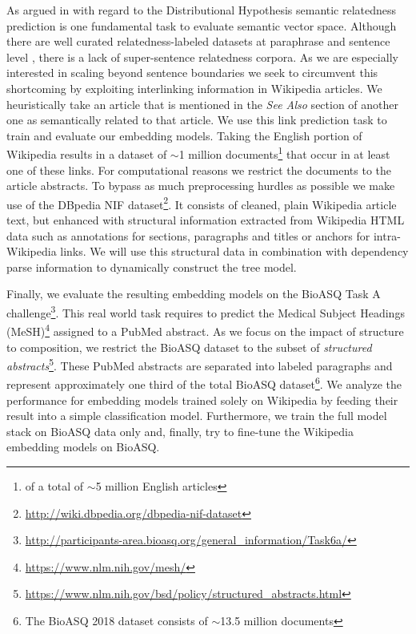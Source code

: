 As argued in \textcite{binder_comparison_2018} with regard to the Distributional Hypothesis \autocite{harris_distributional_1954} semantic relatedness \autocite{resnik_semantic_1999, budanitsky_evaluating_2006} prediction is one fundamental task to evaluate semantic vector space. Although there are well curated relatedness-labeled datasets at paraphrase and sentence level \autocite{pavlick_ppdb_2015, dolan_automatically_2005, marelli_sick_2014,cer_semeval-2017_2017}, there is a lack of super-sentence relatedness corpora. As we are especially interested in scaling beyond sentence boundaries %
we seek to circumvent this shortcoming by exploiting interlinking information in Wikipedia articles. We heuristically take an article that is mentioned in the \textit{See Also} %
section of another one as semantically related to that article. We use this link prediction task to train and evaluate our embedding models. Taking the English portion of Wikipedia results in a dataset of $\sim$1 million documents\footnote{of a total of $\sim$5 million English articles} that occur in at least one of these links. For computational reasons we restrict the documents to the article abstracts. To bypass as much preprocessing hurdles as possible we make use of the DBpedia NIF \autocite{dojchinovski_dbpedia_2018} dataset\footnote{\url{http://wiki.dbpedia.org/dbpedia-nif-dataset}}. It consists of cleaned, plain Wikipedia article text, but enhanced with structural information extracted from Wikipedia HTML data such as annotations for sections, paragraphs and titles or anchors for intra-Wikipedia links. We will use this structural data in combination with dependency parse information to dynamically construct the tree model.

Finally, we evaluate the resulting embedding models on the BioASQ Task A challenge\footnote{\url{http://participants-area.bioasq.org/general_information/Task6a/}}. This real world task requires to predict the Medical Subject Headings (MeSH)\footnote{\url{https://www.nlm.nih.gov/mesh/}} assigned to a PubMed abstract. As we focus on the impact of structure to composition, we restrict the BioASQ dataset to the subset of \textit{structured abstracts}\footnote{\url{https://www.nlm.nih.gov/bsd/policy/structured_abstracts.html}}. These PubMed abstracts are separated into labeled paragraphs and represent approximately one third of the total BioASQ dataset\footnote{The BioASQ 2018 dataset consists of $\sim$13.5 million documents}. We analyze the performance for embedding models trained solely on Wikipedia by feeding their result into a simple classification model. Furthermore, we train the full model stack on BioASQ data only and, finally, try to fine-tune the Wikipedia embedding models on BioASQ.  



